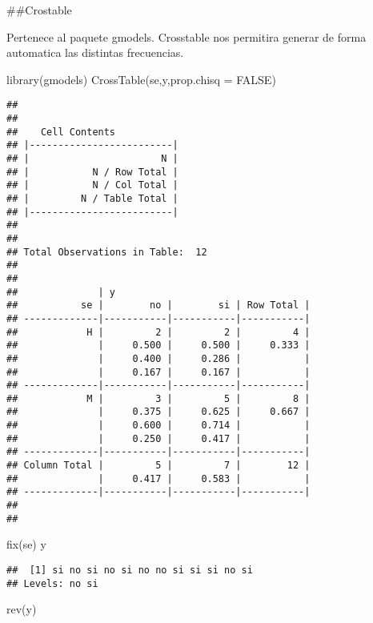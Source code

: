 \documentclass[
]{article}
\newenvironment{Shaded}{\begin{snugshade}}{\end{snugshade}}
\newcommand{\AttributeTok}[1]{\textcolor[rgb]{0.77,0.63,0.00}{#1}}
\newcommand{\ConstantTok}[1]{\textcolor[rgb]{0.00,0.00,0.00}{#1}}
\newcommand{\FunctionTok}[1]{\textcolor[rgb]{0.00,0.00,0.00}{#1}}
\newcommand{\NormalTok}[1]{#1}
\begin{document}
\#\#Crostable

Pertenece al paquete gmodels. Crosstable nos permitira generar de forma
automatica las distintas frecuencias.

\begin{Shaded}
\begin{Highlighting}[]
\FunctionTok{library}\NormalTok{(gmodels)}
\FunctionTok{CrossTable}\NormalTok{(se,y,}\AttributeTok{prop.chisq =} \ConstantTok{FALSE}\NormalTok{)}
\end{Highlighting}
\end{Shaded}

\begin{verbatim}
## 
##  
##    Cell Contents
## |-------------------------|
## |                       N |
## |           N / Row Total |
## |           N / Col Total |
## |         N / Table Total |
## |-------------------------|
## 
##  
## Total Observations in Table:  12 
## 
##  
##              | y 
##           se |        no |        si | Row Total | 
## -------------|-----------|-----------|-----------|
##            H |         2 |         2 |         4 | 
##              |     0.500 |     0.500 |     0.333 | 
##              |     0.400 |     0.286 |           | 
##              |     0.167 |     0.167 |           | 
## -------------|-----------|-----------|-----------|
##            M |         3 |         5 |         8 | 
##              |     0.375 |     0.625 |     0.667 | 
##              |     0.600 |     0.714 |           | 
##              |     0.250 |     0.417 |           | 
## -------------|-----------|-----------|-----------|
## Column Total |         5 |         7 |        12 | 
##              |     0.417 |     0.583 |           | 
## -------------|-----------|-----------|-----------|
## 
## 
\end{verbatim}

\begin{Shaded}
\begin{Highlighting}[]
\FunctionTok{fix}\NormalTok{(se)}
\NormalTok{y}
\end{Highlighting}
\end{Shaded}

\begin{verbatim}
##  [1] si no si no si no no si si si no si
## Levels: no si
\end{verbatim}

\begin{Shaded}
\begin{Highlighting}[]
\FunctionTok{rev}\NormalTok{(y)}
\end{Highlighting}
\end{Shaded}
\end{document}
